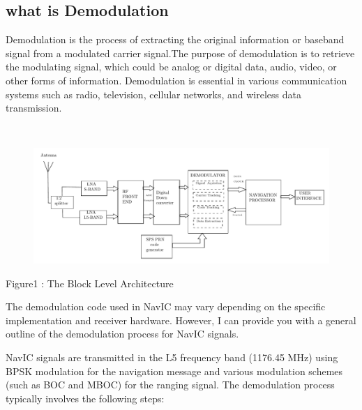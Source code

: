 \documentclass[onecolumn]{article}
\title{\mytitle}
\author{\myauthor\hspace{1em}\\\contact\ FWC22098 -\hspace{0.5em}IITH \hspace{0.5em}\mymodule\hspace{6em}}
\begin{document}
\maketitle
\begin{enumerate}
\begin{Large}


\section{what is Demodulation}
\item[\textbf{}] 

Demodulation is the process of extracting the original information or baseband signal from a modulated carrier signal.The purpose of demodulation is to retrieve the modulating signal, which could be analog or digital data, audio, video, or other forms of information. Demodulation is essential in various communication systems such as radio, television, cellular networks, and wireless data transmission.
\end{Large}\\

\begin{figure}[!h]%
\centering%
\includegraphics{figures/block1}
\end{figure}
\begin{Large}
\begin{center}
Figure1 : The Block Level Architecture
\end{center}

The demodulation code used in NavIC may vary depending on the specific implementation and receiver hardware. However, I can provide you with a general outline of the demodulation process for NavIC signals.

NavIC signals are transmitted in the L5 frequency band (1176.45 MHz) using BPSK modulation for the navigation message and various modulation schemes (such as BOC and MBOC) for the ranging signal. The demodulation process typically involves the following steps:


\end{Large}
\end{enumerate}
\end{document}
